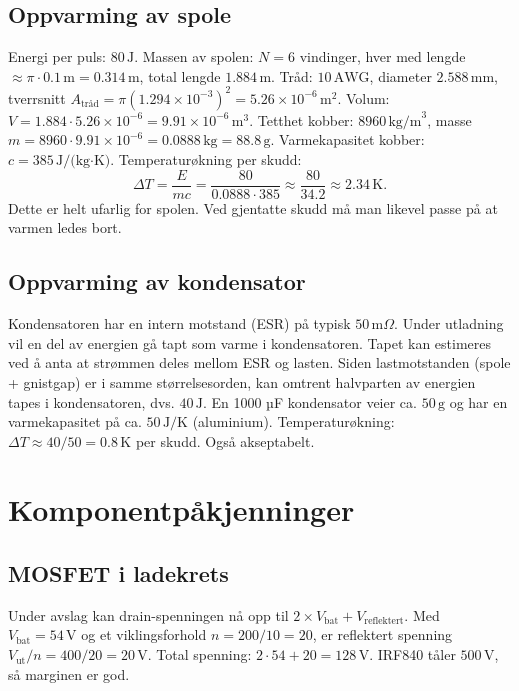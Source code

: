 \documentclass{article}
\begin{document}
\subsection{Oppvarming av spole}
Energi per puls: $80\,\text{J}$. Massen av spolen: $N=6$ vindinger, hver med lengde $\approx \pi \cdot 0.1\,\text{m} = 0.314\,\text{m}$, total lengde $1.884\,\text{m}$. Tråd: $10\,\text{AWG}$, diameter $2.588\,\text{mm}$, tverrsnitt $A_{\text{tråd}} = \pi (1.294\times10^{-3})^2 = 5.26 \times 10^{-6}\,\text{m}^2$. Volum: $V = 1.884 \cdot 5.26\times10^{-6} = 9.91 \times 10^{-6}\,\text{m}^3$. Tetthet kobber: $8960\,\text{kg/m}^3$, masse $m = 8960 \cdot 9.91\times10^{-6} = 0.0888\,\text{kg} = 88.8\,\text{g}$. Varmekapasitet kobber: $c = 385\,\text{J/(kg·K)}$. Temperaturøkning per skudd:
\begin{equation}
\Delta T = \frac{E}{m c} = \frac{80}{0.0888 \cdot 385} \approx \frac{80}{34.2} \approx 2.34\,\text{K}.
\end{equation}
Dette er helt ufarlig for spolen. Ved gjentatte skudd må man likevel passe på at varmen ledes bort.

\subsection{Oppvarming av kondensator}
Kondensatoren har en intern motstand (ESR) på typisk $50\,\text{m}\Omega$. Under utladning vil en del av energien gå tapt som varme i kondensatoren. Tapet kan estimeres ved å anta at strømmen deles mellom ESR og lasten. Siden lastmotstanden (spole + gnistgap) er i samme størrelsesorden, kan omtrent halvparten av energien tapes i kondensatoren, dvs. $40\,\text{J}$. En 1000 µF kondensator veier ca. $50\,\text{g}$ og har en varmekapasitet på ca. $50\,\text{J/K}$ (aluminium). Temperaturøkning: $\Delta T \approx 40/50 = 0.8\,\text{K}$ per skudd. Også akseptabelt.

\section{Komponentpåkjenninger}

\subsection{MOSFET i ladekrets}
Under avslag kan drain-spenningen nå opp til $2 \times V_{\text{bat}} + V_{\text{reflektert}}$. Med $V_{\text{bat}} = 54\,\text{V}$ og et viklingsforhold $n = 200/10 = 20$, er reflektert spenning $V_{\text{ut}}/n = 400/20 = 20\,\text{V}$. Total spenning: $2 \cdot 54 + 20 = 128\,\text{V}$. IRF840 tåler $500\,\text{V}$, så marginen er god.
\end{document}

